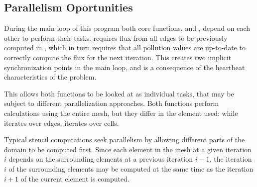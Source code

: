 \subsection{Parallelism Oportunities}

During the main loop of this program both core functions, \computeflux and \update, depend on each other to perform their tasks. \update requires flux from all edges to be previously computed in \computeflux, which in turn requires that all pollution values are up-to-date to correctly compute the flux for the next iteration. This creates two implicit synchronization points in the main loop, and is a consequence of the heartbeat characteristics of the problem.

This allows both functions to be looked at as individual tasks, that may be subject to different parallelization approaches. Both functions perform calculations using the entire mesh, but they differ in the element used: while \computeflux iterates over edges, \update iterates over cells.


Typical stencil computations seek parallelism by allowing different parts of the domain to be computed first. Since each element in the mesh at a given iteration $i$ depends on the surrounding elements at a previous iteration $i-1$, the iteration $i$ of the surrounding elements may be computed at the same time as the iteration $i+1$ of the current element is computed.